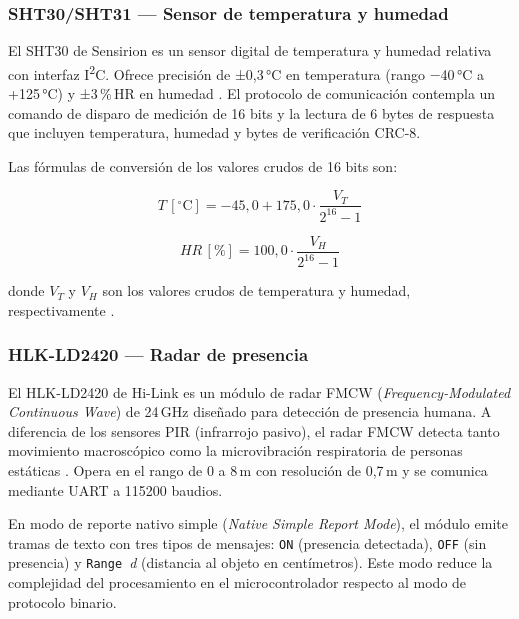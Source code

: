 \subsubsection{SHT30/SHT31 — Sensor de temperatura y humedad}

El SHT30 de Sensirion es un sensor digital de temperatura y humedad relativa con
interfaz I\textsuperscript{2}C. Ofrece precisión de ±0,3\,°C en temperatura
(rango $-$40\,°C a +125\,°C) y ±3\,\%\,HR en humedad \parencite{Sensirion2023}.
El protocolo de comunicación contempla un comando de disparo de medición de 16 bits
y la lectura de 6 bytes de respuesta que incluyen temperatura, humedad y bytes de
verificación CRC-8.

Las fórmulas de conversión de los valores crudos de 16 bits son:

\begin{equation}
  T\,[\mathrm{{}^{\circ}C}] = -45{,}0 + 175{,}0 \cdot \frac{V_T}{2^{16}-1}
  \label{eq:sht_temp}
\end{equation}

\begin{equation}
  HR\,[\%] = 100{,}0 \cdot \frac{V_H}{2^{16}-1}
  \label{eq:sht_hum}
\end{equation}

\noindent donde $V_T$ y $V_H$ son los valores crudos de temperatura y humedad,
respectivamente \parencite{Sensirion2023}.

\subsubsection{HLK-LD2420 — Radar de presencia}

El HLK-LD2420 de Hi-Link es un módulo de radar FMCW (\textit{Frequency-Modulated
Continuous Wave}) de 24\,GHz diseñado para detección de presencia humana. A
diferencia de los sensores PIR (infrarrojo pasivo), el radar FMCW detecta tanto
movimiento macroscópico como la microvibración respiratoria de personas estáticas
\parencite{HiLink2023}. Opera en el rango de 0 a 8\,m con resolución de 0,7\,m y
se comunica mediante UART a 115200 baudios.

En modo de reporte nativo simple (\textit{Native Simple Report Mode}), el módulo
emite tramas de texto con tres tipos de mensajes: \texttt{ON} (presencia detectada),
\texttt{OFF} (sin presencia) y \texttt{Range }\textit{d} (distancia al objeto en
centímetros). Este modo reduce la complejidad del procesamiento en el
microcontrolador respecto al modo de protocolo binario.

